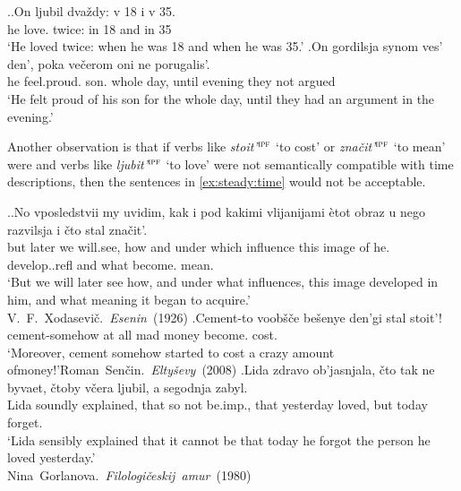 \ex.\label{ex:steady:adv}\ag.On ljubil dva\v{z}dy: v 18 i v 35.\\
he love. twice: in 18 and in 35\\
\trans `He loved twice: when he was 18 and when he was 35.'
\bg.On gordilsja synom ves' den', poka ve\v{c}erom oni ne porugalis'.\\
he feel.proud. son. whole day, until evening they not argued\\
\trans `He felt proud of his son for the whole day, until they had an argument in the evening.'

Another observation is that if verbs like \textit{stoit'}$^{\textsc{ipf}}$ `to cost' or \textit{zna\v{c}it'}$^{\textsc{ipf}}$ `to mean' were  and verbs like \textit{ljubit'$^{\textsc{ipf}}$} `to love' were not semantically compatible with time descriptions, then the sentences in \ref{ex:steady:time} would not be acceptable.\largerpage

\ex.\label{ex:steady:time}\ag.No vposledstvii my uvidim, kak i pod kakimi vlijanijami \`{e}tot obraz u nego razvilsja i \v{c}to stal zna\v{c}it'.\\
but later we will.see, how and under which influence this image of he. develop..refl and what become. mean.\\
\trans `But we will later see how, and under what influences, this image developed in him, and what meaning it began to acquire.'\\\hbox{}\hfill\hbox{V. F. Xodasevi\v{c}. \textit{Esenin} (1926)}
\bg.Cement-to voob\v{s}\v{c}e be\v{s}enye den'gi stal stoit'!\\
cement-somehow {at all} mad money become. cost.\\
\trans `Moreover, cement somehow started to cost a crazy amount of\linebreak money!'\hbox{}\hfill\hbox{Roman Sen\v{c}in. \textit{Elty\v{s}evy} (2008)}
\bg.Lida zdravo ob'jasnjala, \v{c}to tak ne byvaet, \v{c}toby v\v{c}era ljubil, a segodnja zabyl.\\
Lida soundly explained, that so not be.imp., that yesterday loved, but today forget.\\
\trans `Lida sensibly explained that it cannot be that today he forgot the person he loved yesterday.'\\\hbox{}\hfill\hbox{Nina Gorlanova. \textit{Filologi\v{c}eskij amur} (1980)}

